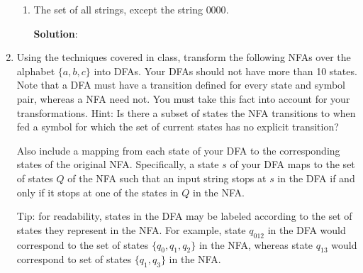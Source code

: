 \documentclass[11pt]{article}
\begin{document}
\begin{enumerate}
\begin{enumerate}
    \item The set of all strings, except the string $0000$.

        \textbf{Solution}:
\end{enumerate}

\newpage

\item Using the techniques covered in class, transform the following NFAs over the alphabet $\{a, b, c\}$ into DFAs. Your DFAs should not have more than 10 states.  Note that a DFA must have a transition defined for every state and symbol pair, whereas a NFA need not. You must take this fact into account for your transformations. Hint: Is there a subset of states the NFA transitions to when fed a symbol for which the set of current states has no explicit transition?

Also include a mapping from each state of your DFA to the corresponding states of the original NFA.  Specifically, a state $s$ of your DFA maps to the set of states $Q$ of the NFA such that an input string stops at $s$ in the DFA if and only if it stops at one of the states in $Q$ in the NFA.

Tip: for readability, states in the DFA may be labeled according to the set of states they represent in the NFA.  For example, state $q_{012}$ in the DFA would correspond to the set of states $\{q_0, q_1, q_2\}$ in the NFA, whereas state $q_{13}$ would correspond to set of states $\{q_1, q_3\}$ in the NFA.


\end{enumerate}
\end{document}
